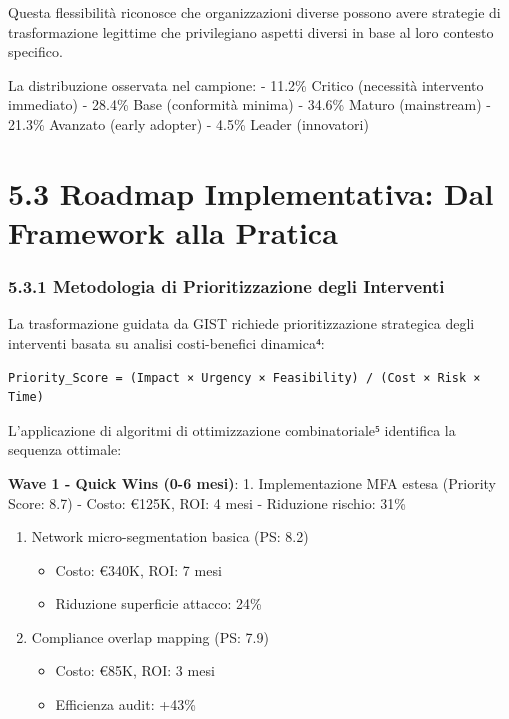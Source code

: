 \documentclass[12pt,a4paper,oneside]{book}
\providecommand{\tightlist}{%
  \setlength{\itemsep}{0pt}\setlength{\parskip}{0pt}
}
\begin{document}
Questa flessibilità riconosce che organizzazioni diverse possono avere
strategie di trasformazione legittime che privilegiano aspetti diversi
in base al loro contesto specifico.

La distribuzione osservata nel campione: - 11.2\% Critico (necessità
intervento immediato) - 28.4\% Base (conformità minima) - 34.6\% Maturo
(mainstream) - 21.3\% Avanzato (early adopter) - 4.5\% Leader
(innovatori)

\section{5.3 Roadmap Implementativa: Dal Framework alla
Pratica}\label{roadmap-implementativa-dal-framework-alla-pratica}

\subsubsection{5.3.1 Metodologia di Prioritizzazione degli
Interventi}\label{metodologia-di-prioritizzazione-degli-interventi}

La trasformazione guidata da GIST richiede prioritizzazione strategica
degli interventi basata su analisi costi-benefici dinamica⁴:

\begin{verbatim}
Priority_Score = (Impact × Urgency × Feasibility) / (Cost × Risk × Time)
\end{verbatim}

L'applicazione di algoritmi di ottimizzazione combinatoriale⁵ identifica
la sequenza ottimale:

\textbf{Wave 1 - Quick Wins (0-6 mesi)}: 1. Implementazione MFA estesa
(Priority Score: 8.7) - Costo: €125K, ROI: 4 mesi - Riduzione rischio:
31\%

\begin{enumerate}
\def\labelenumi{\arabic{enumi}.}
\setcounter{enumi}{1}
\tightlist
\item
  Network micro-segmentation basica (PS: 8.2)

  \begin{itemize}
  \tightlist
  \item
    Costo: €340K, ROI: 7 mesi
  \item
    Riduzione superficie attacco: 24\%
  \end{itemize}
\item
  Compliance overlap mapping (PS: 7.9)

  \begin{itemize}
  \tightlist
  \item
    Costo: €85K, ROI: 3 mesi
  \item
    Efficienza audit: +43\%
  \end{itemize}
\end{enumerate}
\end{document}
